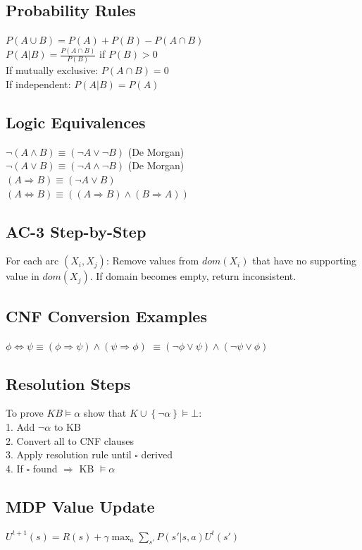 \documentclass[8pt,landscape,a4paper]{article}
\begin{document}
\begin{multicols*}{3}
\subsection{Probability Rules}
$P(A \cup B) = P(A) + P(B) - P(A \cap B)$\\
$P(A|B) = \frac{P(A \cap B)}{P(B)}$ if $P(B) > 0$\\
If mutually exclusive: $P(A \cap B) = 0$\\
If independent: $P(A|B) = P(A)$

\subsection{Logic Equivalences}
$\neg(A \wedge B) \equiv (\neg A \vee \neg B)$ (De Morgan)\\
$\neg(A \vee B) \equiv (\neg A \wedge \neg B)$ (De Morgan)\\
$(A \Rightarrow B) \equiv (\neg A \vee B)$\\
$(A \Leftrightarrow B) \equiv ((A \Rightarrow B) \wedge (B \Rightarrow A))$

\subsection{AC-3 Step-by-Step}
For each arc $(X_i, X_j)$: Remove values from $dom(X_i)$ that have no supporting value in $dom(X_j)$. If domain becomes empty, return inconsistent.

\subsection{CNF Conversion Examples}
$\phi \Leftrightarrow \psi \equiv (\phi \Rightarrow \psi) \wedge (\psi \Rightarrow \phi)$
$\equiv (\neg\phi \vee \psi) \wedge (\neg\psi \vee \phi)$

\subsection{Resolution Steps}
To prove $KB \models \alpha$ show that $K\cup\left\{\neg\alpha\right\}\models\bot $:\\
1. Add $\neg\alpha$ to KB\\
2. Convert all to CNF clauses\\
3. Apply resolution rule until $\square$ derived\\
4. If $\square$ found $\Rightarrow$ KB $\models \alpha$

\subsection{MDP Value Update}
$U^{t+1}(s) = R(s) + \gamma \max_a \sum_{s'} P(s'|s,a) U^t(s')$


\end{multicols*}
\end{document}
